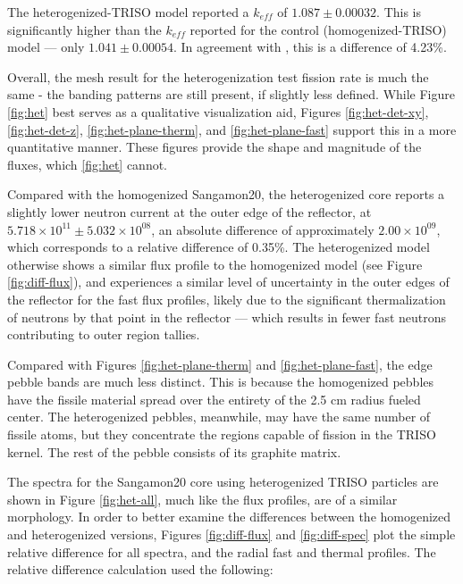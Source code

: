 

The heterogenized-TRISO model reported a $k_{eff}$ of $1.087 \pm 0.00032$.  This is significantly higher than the $k_{eff}$ reported for the control (homogenized-TRISO) model --- only $1.041 \pm 0.00054$.  In agreement with \cite{brown_stochastic_2005}, this is a difference of 4.23\%.  

Overall, the mesh result for the heterogenization test fission rate is much the same - the banding patterns are still present, if slightly less defined.  While Figure \ref{fig:het} best serves as a qualitative visualization aid, Figures \ref{fig:het-det-xy}, \ref{fig:het-det-z}, \ref{fig:het-plane-therm}, and \ref{fig:het-plane-fast} support this in a more quantitative manner.  These figures provide the shape and magnitude of the fluxes, which \ref{fig:het} cannot.




Compared with the homogenized Sangamon20, the heterogenized core reports a slightly lower neutron current at the outer edge of the reflector, at $5.718\times10^{11} \pm 5.032\times10^{08}$, an absolute difference of approximately $2.00\times10^{09}$, which corresponds to a relative difference of 0.35\%.  The heterogenized model otherwise shows a similar flux profile to the homogenized model (see Figure \ref{fig:diff-flux}), and experiences a similar level of uncertainty in the outer edges of the reflector for the fast flux profiles, likely due to the significant thermalization of neutrons by that point in the reflector --- which results in fewer fast neutrons contributing to outer region tallies.







Compared with Figures  \ref{fig:het-plane-therm} and \ref{fig:het-plane-fast}, the edge pebble bands are much less distinct.  This is because the homogenized pebbles have the fissile material spread over the entirety of the 2.5 cm radius fueled center.  The heterogenized pebbles, meanwhile, may have the same number of fissile atoms, but they concentrate the regions capable of fission in the TRISO kernel.  The rest of the pebble consists of its graphite matrix.




The spectra for the Sangamon20 core using heterogenized TRISO particles are shown in Figure \ref{fig:het-all}, much like the flux profiles, are of a similar morphology.  In order to better examine the differences between the homogenized and heterogenized versions, Figures \ref{fig:diff-flux} and \ref{fig:diff-spec} plot the simple relative difference for all spectra, and the radial fast and thermal profiles.  The relative difference calculation used the following:

